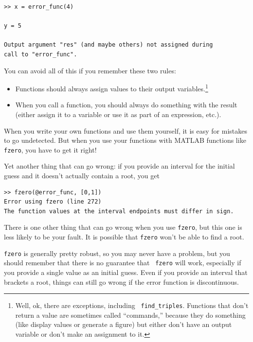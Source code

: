 \documentclass[
]{book}
\begin{document}
\begin{verbatim}
>> x = error_func(4)

y = 5

Output argument "res" (and maybe others) not assigned during
call to "error_func".
\end{verbatim}

You can avoid all of this if you remember these two rules:

\begin{itemize}

\item Functions should always assign values to their output
variables.\footnote{Well, ok, there are exceptions, including {\tt
find\_triples}. Functions that don't return a value are sometimes
called ``commands,'' because they do something (like display
values or generate a figure) but either don't have an output
variable or don't make an assignment to it.}

\item When you call a function, you should always do something with
the result (either assign it to a variable or use it as part of an
expression, etc.).

\end{itemize}

When you write your own functions and use them yourself, it is easy
for mistakes to go undetected.  But when you use your functions with
MATLAB functions like {\tt fzero}, you have to get it right!

Yet another thing that can go wrong: if you provide an interval for the
initial guess and it doesn't actually contain a root, you get

\begin{verbatim}
>> fzero(@error_func, [0,1])
Error using fzero (line 272)
The function values at the interval endpoints must differ in sign.
\end{verbatim}

There is one other thing that can go wrong when you use {\tt fzero}, but
this one is less likely to be your fault.  It is possible that {\tt fzero}
won't be able to find a root.

{\tt fzero} is generally pretty robust, so you may never have a
problem, but you should remember that there is no guarantee that {\tt
fzero} will work, especially if you provide a single value as an
initial guess.  Even if you provide an interval that brackets a root,
things can still go wrong if the error function is discontinuous.
\end{document}
